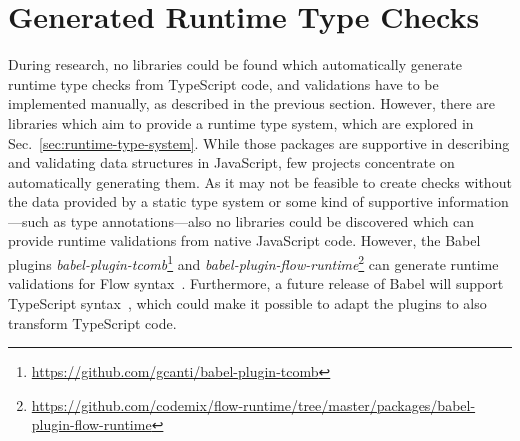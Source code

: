 
\section{Generated Runtime Type Checks}
\label{sec:existing-projects}

During research, no libraries could be found which automatically generate runtime type checks from TypeScript code, and validations have to be implemented manually, as described in the previous section. However, there are libraries which aim to provide a runtime type system, which are explored in Sec.~\ref{sec:runtime-type-system}. While those packages are supportive in describing and validating data structures in JavaScript, few projects concentrate on automatically generating them. As it may not be feasible to create checks without the data provided by a static type system or some kind of supportive information---such as type annotations---also no libraries could be discovered which can provide runtime validations from native JavaScript code. However, the Babel plugins \emph{babel-plugin-tcomb}\footnote{\url{https://github.com/gcanti/babel-plugin-tcomb}} and \emph{babel-plugin-flow-runtime}\footnote{\url{https://github.com/codemix/flow-runtime/tree/master/packages/babel-plugin-flow-runtime}} can generate runtime validations for Flow syntax~\cites{RuntimeTypeSystem:tcomb:babel, RuntimeTypeSystem:flow-runtime:babel}. Furthermore, a future release of Babel will support TypeScript syntax~\cite{Babel:TypeScript}, which could make it possible to adapt the plugins to also transform TypeScript code.
